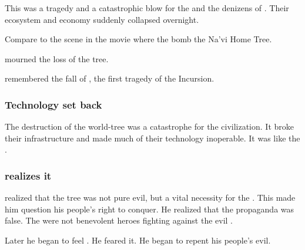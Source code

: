 This was a tragedy and a catastrophic blow for the \dragons and the denizens of \Tembrae.
Their ecosystem and economy suddenly collapsed overnight. 

Compare to the scene in the movie \cite{Movie:Avatar} where the \humans bomb the Na'vi Home Tree. 

\Rystessakhin mourned the loss of the tree. 


\Rystessakhin remembered the fall of \Nexagglachel, the first tragedy of the Incursion. 






\subsubsection{Technology set back}
The destruction of the world-tree was a catastrophe for the \ophidian civilization.
It broke their infrastructure and made much of their technology inoperable. 
It was like the . 





\subsubsection{\Sithiyacaan realizes it}
\Sithiyacaan realized that the tree was not pure evil, but a vital necessity for the \Tembraeans. 
This made him question his people's right to conquer. 
He realized that the \bane propaganda was false. 
The \resphain were not benevolent heroes fighting against the evil \dragons. 

Later he began to feel \NexagglachelsCurse. 
He feared it. 
He began to repent his people's evil. 










